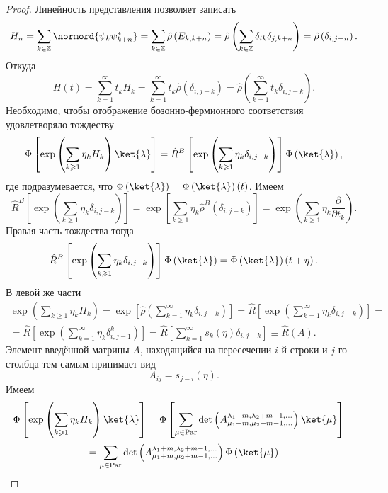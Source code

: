 \documentclass[a4paper,14pt]{extarticle}
\numberwithin{equation}{section}
\begin{document}
\begin{proof}
Линейность представления позволяет записать
\begin{equation}
	H_n =\sum_{k \in \mathbb{Z}}^{} \normord{\psi_k \psi_{k+n}^*}=
	\sum_{k \in \mathbb{Z}}^{} \hat{\rho}\left( E_{k,k+n} \right) =
	\hat{\rho} \left( \sum_{k \in \mathbb{Z}}^{}\delta_{ik}
	\delta_{j,k+n}\right) =
	\hat{\rho}\left( \delta_{i,j-n} \right) 
	\label{eq:2284}
.\end{equation} 
Откуда
\begin{equation}
H(t)= \sum_{k=1}^{\infty} t_k H_k= \sum_{k=1}^{\infty} 
t_k \hat{\rho}\left( \delta_{i,j-k} \right) =
\hat{\rho} \left(\sum_{k=1}^{\infty} t_k  \delta_{i,j-k} \right)
\label{eq:2285}
.\end{equation} 
Необходимо, чтобы отображение бозонно-фермионного соответствия
удовлетворяло тождеству
\[
\Phi\left[ \exp \left( \sum_{k\ge 1}^{} \eta_k H_k \right) \ket{\lambda} \right] =
\hat{R}^B \left[ \exp \left( \sum_{k\ge 1}^{} \eta_k \delta_{i,j-k} \right) \right] \Phi\left( \ket{\lambda} \right) 
,\]
где подразумевается, что $\Phi\left( \ket{\lambda} \right) =
 \Phi\left( \ket{\lambda} \right) (t)$.
Имеем
\[
\hat{R}^B \left[ \exp \left( \sum_{k\ge 1}^{} \eta_k \delta_{i,j-k} \right) \right] =
 \exp \left[ \sum_{k\ge 1}^{} \eta_k \hat{\rho}^B \left(\delta_{i,j-k}\right)  \right] =
\exp \left( \sum_{k\ge 1}^{} \eta_k \frac{\partial }{\partial t_k}  \right) 
.\] 
Правая часть тождества тогда
\[
\hat{R}^B \left[ \exp \left( \sum_{k\ge 1}^{} \eta_k \delta_{i,j-k} \right) \right] \Phi\left( \ket{\lambda} \right) =\Phi\left( \ket{\lambda} \right) \left( t+\eta \right) 
.\] 
В левой же части 
\begin{multline}
	\exp \left( \sum_{k\ge 1}^{} \eta_k H_k \right) =\exp \left[ \hat{\rho} \left( \sum_{k=1}^{\infty} \eta_k \delta_{i,j-k} \right)  \right] =\hat{R} \left[\exp \left( \sum_{k=1}^{\infty} \eta_k \delta_{i,j-k}\right) \right] =\\=
	\hat{R}\left[ \exp \left( \sum_{k=1}^{\infty} \eta_k \delta_{i,j-1}^k \right)  \right] =\hat{R}\left[ 
	\sum_{k=1}^{\infty} s_k(\eta)\delta_{i,j-k}\right]\equiv
	\hat{R} \left( A \right) 
.\end{multline} 
Элемент введённой матрицы $A$, находящийся на пересечении
$i$-й строки и $j$-го столбца тем самым принимает вид
\[
A_{ij}=s_{j-i}(\eta)
.\] 
Имеем
\begin{multline}
	\Phi\left[\exp \left( \sum_{k\ge 1}^{} \eta_k H_k \right) \ket{\lambda}\right] = \Phi\left[\sum_{\mu \in \mathrm{Par}}^{} \det \left(A_{\mu_1+m,\mu_2+m-1,\ldots}^{\lambda_1+m,\lambda_2+m-1,\ldots}\right) \ket{\mu}\right]=\\=\sum_{\mu \in \mathrm{Par}}^{} \det \left(A_{\mu_1+m,\mu_2+m-1,\ldots}^{\lambda_1+m,\lambda_2+m-1,\ldots}\right) \Phi\left(\ket{\mu}\right)		\label{}

\end{multline}
\end{proof}
\end{document}
